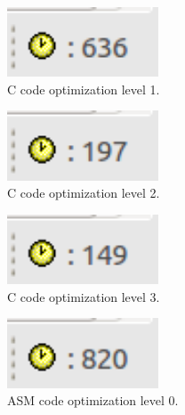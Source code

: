 \documentclass{article}
\begin{document}
\begin{figure}[h!]
  \begin{center}
    \includegraphics[width=0.4\textwidth]{img/c_opt_1.png}
    \caption{C code optimization level 1.}
  \end{center}
\end{figure}

\begin{figure}[h!]
  \begin{center}
    \includegraphics[width=0.4\textwidth]{img/c_opt_2.png}
    \caption{C code optimization level 2.}
  \end{center}
\end{figure}

\begin{figure}[h!]
  \begin{center}
    \includegraphics[width=0.4\textwidth]{img/c_opt_3.png}
    \caption{C code optimization level 3.}
  \end{center}
\end{figure}

\begin{figure}[h!]
  \begin{center}
    \includegraphics[width=0.4\textwidth]{img/asm_opt_0.png}
    \caption{ASM code optimization level 0.}
  \end{center}
\end{figure}
\end{document}
